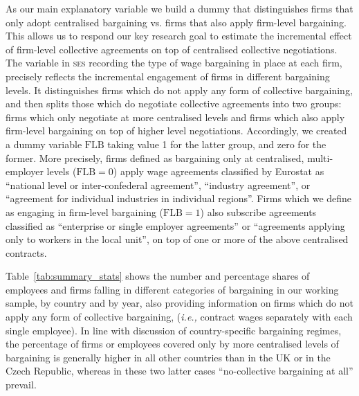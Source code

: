 \documentclass[12pt]{article}
\begin{document}

As our main explanatory variable we build a dummy that distinguishes
firms that only adopt centralised bargaining vs. firms that also apply
firm-level bargaining. This allows us to respond our key research goal
to estimate the incremental effect of firm-level collective agreements
on top of centralised collective negotiations. The variable in
\textsc{ses} recording the type of wage bargaining in place at each
firm, precisely reflects the incremental engagement of firms in
different bargaining levels. It distinguishes firms which do not apply
any form of collective bargaining, and then splits those which do
negotiate collective agreements into two groups: firms which only
negotiate at more centralised levels and firms which also apply
firm-level bargaining on top of higher level negotiations.
Accordingly, we created a dummy variable $\mathrm{FLB}$ taking value 1
for the latter group, and zero for the former. More precisely, firms
defined as bargaining only at centralised, multi-employer levels
($\mathrm{FLB}=0$) apply wage agreements classified by Eurostat as
``national level or inter-confederal agreement'', ``industry
agreement'', or ``agreement for individual industries in individual
regions''. Firms which we define as engaging in firm-level bargaining
($\mathrm{FLB}=1$) also subscribe agreements classified as
``enterprise or single employer agreements'' or ``agreements applying
only to workers in the local unit'', on top of one or more of the
above centralised contracts.

Table~\ref{tab:summary_stats} shows the number and percentage shares
of employees and firms falling in different categories of bargaining
in our working sample, by country and by year, also providing
information on firms which do not apply any form of collective
bargaining, (\emph{i.e.,} contract wages separately with each single
employee). In line with discussion of country-specific bargaining
regimes, the percentage of firms or employees covered only by more
centralised levels of bargaining is generally higher in all other
countries than in the UK or in the Czech Republic, whereas in these
two latter cases ``no-collective bargaining at all'' prevail.
\end{document}
